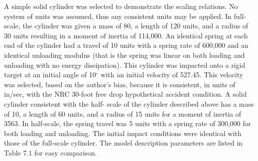      A simple solid cylinder was selected to demonstrate the
scaling relations.  No system of units was assumed, thus any
consistent units may be applied. In full-scale, the cylinder
was given
a mass of 80, a length of 120 units, and a radius of 
30 units resulting in a
moment of inertia of 114,000.
An identical spring at each end of the
cylinder had a travel of 10 units with a spring rate of 
600,000 and an identical
unloading modulus (that is the spring was linear on both loading and
unloading with no energy dissipation). This cylinder 
was impacted onto a
rigid target at an initial angle of 10$^\circ$ with an initial velocity
of 527.45.  This velocity was selected, 
based on the author's bias, because it is consistent, in units of
in/sec, with the NRC 30-foot free drop
hypothetical accident condition. A solid cylinder consistent 
with the half-
scale of the cylinder described above has a mass of 10,
a length of 60 units, 
and a radius of 15 units 
for a moment of inertia of 3563.  In half-scale,
the spring travel was 5 units with a spring rate of 
300,000 for both loading
and unloading.  The initial impact conditions were identical with 
those of the
full-scale cylinder.  The model description parameters are listed in
Table 7.1 for easy comparison. 

